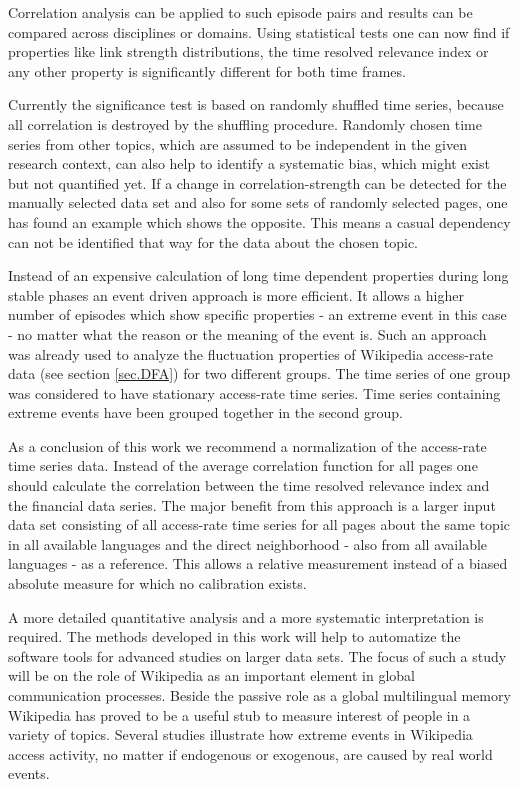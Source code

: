 \documentclass[a4paper,10pt]{scrbook}
\begin{document}
Correlation analysis can be applied to such episode pairs and results can be compared across disciplines or domains. Using statistical tests one can now find if properties like link strength distributions, the time resolved relevance index or any other property is significantly different for both time frames.

Currently the significance test is based on randomly shuffled time series, because all correlation is destroyed by the shuffling procedure. Randomly chosen time series from other topics, which are assumed to be independent in the given research context, can also help to identify a systematic bias, which might exist but not quantified yet. If a change in correlation-strength can be detected for the manually selected data set and also for some sets of randomly selected pages, one has found an example which shows the opposite. This means a casual dependency can not be identified that way for the data about the chosen topic.  

Instead of an expensive calculation of long time dependent properties during long stable phases an event driven approach is more efficient. It allows a higher number of episodes which show specific properties - an extreme event in this case - no matter what the reason or the meaning of the event is. Such an approach was already used to analyze the fluctuation properties of Wikipedia access-rate data (see section \ref{sec.DFA}) for two different groups. The time series of one group was considered to have stationary access-rate time series. Time series containing extreme events have been grouped together in the second group.

As a conclusion of this work we recommend a normalization of the access-rate time series data. Instead of the average correlation function for all pages one should calculate the correlation between the time resolved relevance index and the financial data series. The major benefit from this approach is a larger input data set consisting of all access-rate time series for all pages about the same topic in all available languages and the direct neighborhood - also from all available languages - as a reference. This allows a relative measurement instead of a biased absolute measure for which no calibration exists.

A more detailed quantitative analysis and a more systematic interpretation is required. The methods developed in this work will help to automatize the software tools for advanced studies on larger data sets. The focus of such a study will be on the role of Wikipedia as an important element in global communication processes. Beside the passive role as a global multilingual memory Wikipedia has proved to be a useful stub to measure interest of people in a variety of topics. Several studies illustrate how extreme events in Wikipedia access activity, no matter if endogenous or exogenous, are caused by real world events. 
\end{document}
